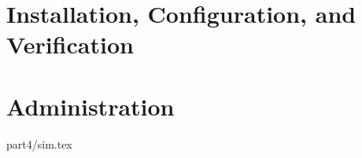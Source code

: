% 
% 
% 
% 

\ifpdf
\else
{}
\fi
\chapter{Installation, Configuration, and Verification}


\ifpdf
\else
{}
\fi
\chapter{Administration}












 {part4/sim.tex}
